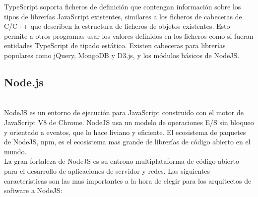 \documentclass[a4paper, 11pt]{article}
\begin{document}
\begin{itemize}
          TypeScript soporta ficheros de definición que contengan información sobre
          los tipos de librerías JavaScript existentes, similares a los ficheros de
          cabeceras de C/C++ que describen la estructura de ficheros de objetos
          existentes. Esto permite a otros programas usar los valores definidos en
          los ficheros como si fueran entidades TypeScript de tipado estático.
          Existen cabeceras para librerías populares como jQuery, MongoDB y D3.js, y
          los módulos básicos de NodeJS.

        \subsection{Node.js}\\

          NodeJS es un entorno de ejecución para JavaScript construido con el
          motor de JavaScript V8 de Chrome. NodeJS usa un modelo de operaciones E/S
          sin bloqueo y orientado a eventos, que lo hace liviano y eficiente. El
          ecosistema de paquetes de NodeJS, npm, es el ecosistema mas grande de
          librerías de código abierto en el mundo.\\

          La gran fortaleza de NodeJS es su entrono multiplataforma de código
          abierto para el desarrollo de aplicaciones de servidor y redes. Las
          siguientes caracteristicas son las mas importantes a la hora de elegir
          para los arquitectos de software a NodeJS:\\


\end{itemize}
\end{document}
